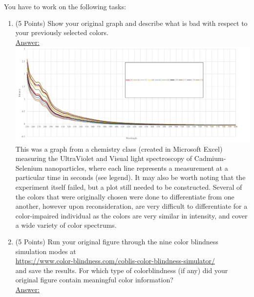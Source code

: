 \documentclass[12pt,letterpaper,final]{article}
\begin{document}
\begin{enumerate}
You have to work on  the following tasks:

\begin{enumerate}
\item (5 Points) Show your original graph and
describe what is bad  with respect to your previously selected colors. \\

\underline{Answer:} \\
{\scriptsize
\includegraphics[width=.9\textwidth]{fionas_bad_graph.PNG}\\
This was a graph from a chemistry class (created in Microsoft Excel) measuring the UltraViolet  and Visual light spectroscopy of Cadmium-Selenium nanoparticles, where each line represents a measurement at a particular time in seconds (see legend). It may also be worth noting that the experiment itself failed, but a plot still needed to be constructed.  Several of the colors that were originally chosen were done to differentiate from one another, however upon reconsideration, are very difficult to differentiate for a color-impaired individual as the colors are very similar in intensity, and cover a wide variety of color spectrums.
}



\item (5 Points) Run your original figure through the nine color blindness
simulation modes at \\
{\small
\url{https://www.color-blindness.com/coblis-color-blindness-simulator/}} \\
and save the results. For which type of colorblindness (if any)
did  your original figure contain meaningful color information? \\

\underline{Answer:} \\


\end{enumerate}
\end{enumerate}
\end{document}
